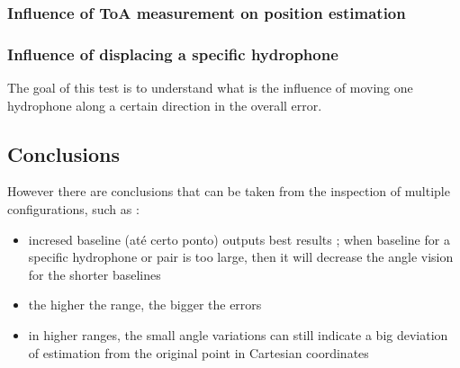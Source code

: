 
\subsubsection{Influence of ToA measurement on position estimation}


\subsubsection{Influence of displacing a specific hydrophone}

The goal of this test is to understand what is the influence of moving one hydrophone along a certain direction in the overall error.


\subsection{Conclusions}

However there are conclusions that can be taken from the inspection of multiple configurations, such as : 
\begin{itemize}
	\item incresed baseline (até certo ponto) outputs best results ; when baseline for a specific hydrophone or pair is too large, then it will decrease the angle vision for the shorter baselines
	\item the higher the range, the bigger the errors
	\item in higher ranges, the small angle variations can still indicate a big deviation of estimation from the original point in Cartesian coordinates
\end{itemize}


